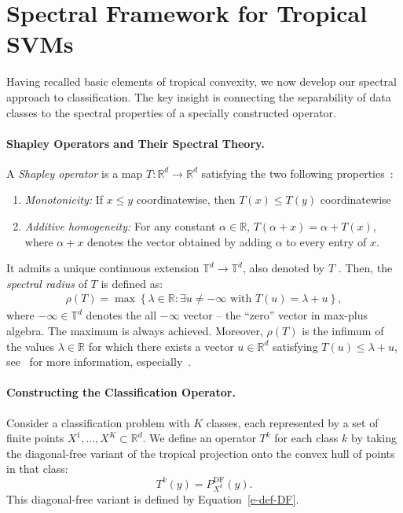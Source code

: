 \documentclass{article}
\renewcommand{\leq}{\leqslant}
\newcommand{\R}{\mathbb{R}}
\newcommand{\T}{\mathbb{T}}
\begin{document}
\section{Spectral Framework for Tropical SVMs}\label{sec:spectral}

Having recalled basic elements of tropical convexity, we now develop our spectral approach to classification. The key insight is connecting the separability of data classes to the spectral properties of a specially constructed operator.

\paragraph{Shapley Operators and Their Spectral Theory.}
A {\em Shapley operator} is a map $T: \R^d \to \R^d$ satisfying the two following properties~\cite{kolokoltsov1992}:
\begin{enumerate}
    \item \textit{Monotonicity:} If $x \leq y$ coordinatewise, then $T(x) \leq T(y)$ coordinatewise
    \item \textit{Additive homogeneity:} For any constant $\alpha \in \R$, $T(\alpha + x) = \alpha + T(x)$,
      where $\alpha +x$ denotes the vector obtained by adding $\alpha$ to every entry of $x$.
\end{enumerate}
It admits a unique continuous extension $\T^d\to \T^d$, also denoted by $T$ \cite{AGGut10}. Then, the {\em spectral radius} of $T$ is defined as:
\begin{align}
\rho(T) = \max\left\{\lambda \in \R : \exists u \neq -\infty \text{ with } T(u) = \lambda + u\right\},
\end{align}
where $-\infty\in \T^d$ denotes the all $-\infty$ vector -- the ``zero'' vector in max-plus algebra.
The maximum is always achieved.
Moreover, $\rho(T)$ is the infimum of the values $\lambda\in \R$ for which there exists a vector $u\in\R^d$
satisfying $T(u) \leq \lambda + u$,
see~\cite{nussbaum1986,AGGut10,akiangaubertqisaadi} for more information,
especially~\cite[Theorem~7]{akiangaubertqisaadi}.

\paragraph{Constructing the Classification Operator.}
Consider a classification problem with $K$ classes, each represented by a set of finite points $X^1,\dots,X^K \subset \R^d$.
We define an operator $T^k$ for each class $k$ by taking the diagonal-free variant of the tropical projection onto the convex hull of points in that class:
\[
T^k(y) = P_{X^k}^{\text{DF}}(y).
\]
This diagonal-free variant is defined by Equation~\ref{e-def-DF}.
\end{document}
